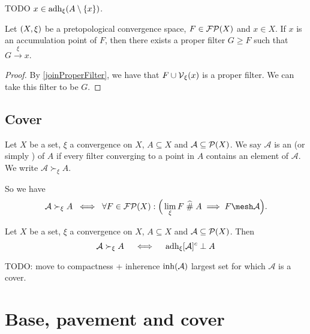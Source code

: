 TODO $x\in \operatorname{adh}_\xi(A\setminus\{x\})$.

\begin{proposition} \label{subfilterToAccumulationPoint}
Let $\sSet{X,\xi}$ be a pretopological convergence space, $F\in\operatorname{\mathcal{FP}}(X)$ and $x\in X$. If $x$ is an accumulation point of $F$, then there exists a proper filter $G \geq F$ such that $G\overset{\xi}{\longrightarrow} x$. 
\end{proposition}
\begin{proof}
By \ref{joinProperFilter}, we have that $F\cup \operatorname{\mathcal{V}}_\xi(x)$ is a proper filter. We can take this filter to be $G$.
\end{proof}

\subsection{Cover}
\begin{definition}
Let $X$ be a set, $\xi$ a convergence on $X$, $A\subseteq X$ and $\mathcal{A}\subseteq \operatorname{\mathcal{P}}(X)$.
We say $\mathcal{A}$ is an  (or simply ) of $A$ if every filter converging to a point in $A$ contains an element of $\mathcal{A}$. We write $\mathcal{A} \succ_\xi A$.
\end{definition}
So we have
\[ \mathcal{A} \succ_\xi A \;\iff\; \forall F\in \powerfilters(X): \Big( \lim_\xi F \amesh A \implies F \mesh \mathcal{A} \Big). \]

\begin{proposition}
Let $X$ be a set, $\xi$ a convergence on $X$, $A\subseteq X$ and $\mathcal{A}\subseteq \operatorname{\mathcal{P}}(X)$. Then
\[ \mathcal{A} \succ_\xi A \quad\iff\quad \operatorname{adh}_\xi [\mathcal{A}]^c \perp A \]
\end{proposition}


TODO: move to compactness + inherence $\operatorname{inh}(\mathcal{A})$ largest set for which $\mathcal{A}$ is a cover.


\section{Base, pavement and cover}
